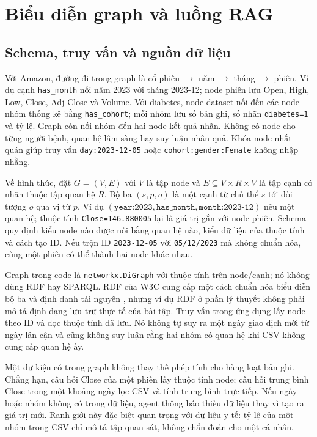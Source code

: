 \documentclass[12pt,a4paper]{report}
\begin{document}
\section{Biểu diễn graph và luồng RAG}
\subsection{Schema, truy vấn và nguồn dữ liệu}
Với Amazon, đường đi trong graph là cổ phiếu $\rightarrow$ năm $\rightarrow$ tháng
$\rightarrow$ phiên. Ví dụ cạnh \texttt{has\_month} nối năm 2023 với tháng 2023-12;
node phiên lưu Open, High, Low, Close, Adj Close và Volume. Với diabetes, node dataset nối đến
các node nhóm thống kê bằng \texttt{has\_cohort}; mỗi nhóm lưu số bản ghi, số nhãn
\texttt{diabetes=1} và tỷ lệ. Graph còn nối nhóm đến hai node kết quả nhãn. Không có node cho
từng người bệnh, quan hệ lâm sàng hay suy luận nhân quả. Khóa node nhất quán giúp truy vấn
\texttt{day:2023-12-05} hoặc \texttt{cohort:gender:Female} không nhập nhằng.

Về hình thức, đặt $G=(V,E)$ với $V$ là tập node và $E\subseteq V\times R\times V$ là tập cạnh có nhãn thuộc tập quan hệ $R$. Bộ ba $(s,p,o)$ là một cạnh từ chủ thể $s$ tới đối tượng $o$ qua vị từ $p$. Ví dụ $(\texttt{year:2023},\texttt{has\_month},\texttt{month:2023-12})$ nêu một quan hệ; thuộc tính \texttt{Close=146.880005} lại là giá trị gắn với node phiên. Schema quy định kiểu node nào được nối bằng quan hệ nào, kiểu dữ liệu của thuộc tính và cách tạo ID. Nếu trộn ID \texttt{2023-12-05} với \texttt{05/12/2023} mà không chuẩn hóa, cùng một phiên có thể thành hai node khác nhau.

Graph trong code là \texttt{networkx.DiGraph} với thuộc tính trên node/cạnh; nó không dùng RDF hay SPARQL. RDF của W3C cung cấp một cách chuẩn hóa biểu diễn bộ ba và định danh tài nguyên \cite{essay03-w3c}, nhưng ví dụ RDF ở phần lý thuyết không phải mô tả định dạng lưu trữ thực tế của bài tập. Truy vấn trong ứng dụng lấy node theo ID và đọc thuộc tính đã lưu. Nó không tự suy ra một ngày giao dịch mới từ ngày lân cận và cũng không suy luận rằng hai nhóm có quan hệ khi CSV không cung cấp quan hệ ấy.

Một dữ kiện có trong graph không thay thế phép tính cho hàng loạt bản ghi. Chẳng hạn, câu hỏi Close
của một phiên lấy thuộc tính node; câu hỏi trung bình Close trong một khoảng ngày lọc CSV và tính
trung bình trực tiếp. Nếu ngày hoặc nhóm không có trong dữ liệu, agent thông báo thiếu dữ liệu
thay vì tạo ra giá trị mới. Ranh giới này đặc biệt quan trọng với dữ liệu y tế: tỷ lệ của một nhóm
trong CSV chỉ mô tả tập quan sát, không chẩn đoán cho một cá nhân.
\end{document}
